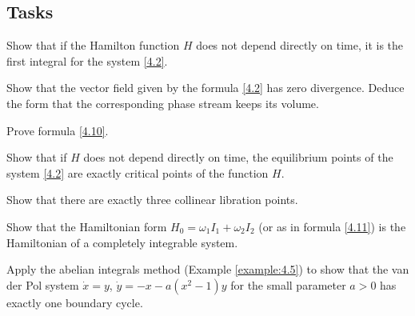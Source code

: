 \subsection*{Tasks}
\begin{task}
	Show that if the Hamilton function $H$ does not depend directly on time, it is the first integral for the system \eqref{4.2}.
\end{task}

\begin{task}
	Show that the vector field given by the formula \eqref{4.2} has zero divergence. Deduce the form that the corresponding phase stream keeps its volume.
\end{task}

\begin{task}
	Prove formula \eqref{4.10}.
\end{task}

\begin{task}
	Show that if $H$ does not depend directly on time, the equilibrium points of the system \eqref{4.2} are exactly critical points of the function $H$.
\end{task}

\begin{task}
	Show that there are exactly three collinear libration points.
\end{task}

\begin{task}
	Show that the Hamiltonian form $H_{0}=\omega
	_{1}I_{1}+\omega _{2}I_{2}$ (or as in formula \eqref{4.11}) is the Hamiltonian of a completely integrable system.
\end{task}

\begin{task}
	Apply the abelian integrals method (Example \ref{example:4.5}) to show that the van der Pol system $\dot{x}=y$, $\dot{y} = -x-a(x^{2}-1)y$ for the small parameter $a> 0$ has exactly one boundary cycle.
\end{task}

